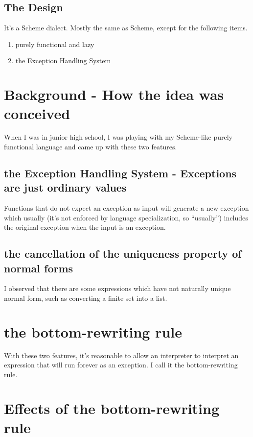 \documentclass[10pt,preprint,numbers]{sigplanconf}
\begin{document}
\subsection{The Design}

It's a Scheme dialect. Mostly the same as Scheme, except for the following items.

\begin{enumerate}
\item purely functional and lazy
\item the Exception Handling System
\end{enumerate}

\section{Background - How the idea was conceived}

When I was in junior high school, I was playing with my Scheme-like purely functional language and
came up with these two features.

\subsection{the Exception Handling System - Exceptions are just ordinary values}

Functions that do not expect an exception as input will generate a new exception which usually (it's not enforced by language specialization, so ``usually'') includes the original exception when the input is an exception.

\subsection{the cancellation of the uniqueness property of normal forms}

I observed that there are some expressions which have not naturally unique normal form, such as converting a finite set into a list.

\section{the bottom-rewriting rule}

With these two features,
it's reasonable to allow an interpreter to interpret an expression that will run forever as an exception.
I call it the bottom-rewriting rule.

\section{Effects of the bottom-rewriting rule}
\end{document}

